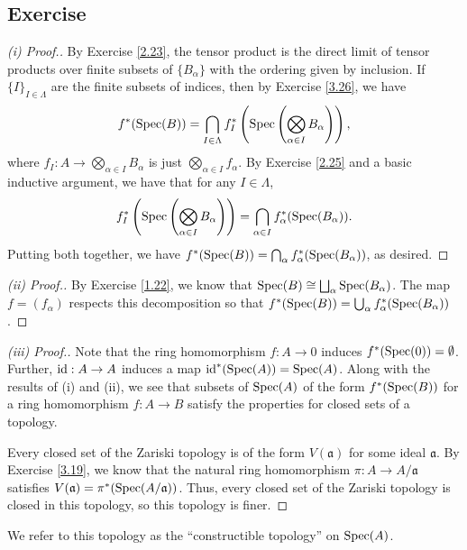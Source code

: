 \subsection{Exercise}\label{3.27}

\begin{proof}[(i) Proof.]
By Exercise \ref{2.23}, the tensor product is the direct limit of tensor products over finite subsets of $\{B_{\alpha}\}$
with the ordering given by inclusion. If $\{I\}_{I \in \Lambda}$ are the finite subsets of indices, then by Exercise \ref{3.26},
we have
$$f^*(\operatorname{Spec}(B)) = \bigcap_{I \in \Lambda}f_I^*\left(\operatorname{Spec}\left(\bigotimes_{\alpha \in I}B_{\alpha}\right)\right),$$
where $f_I : A \to \bigotimes_{\alpha \in I}B_{\alpha}$ is just $\bigotimes_{\alpha \in I}f_{\alpha}$.
By Exercise \ref{2.25} and a basic inductive argument, we have that for any $I \in \Lambda$,
$$f_I^*\left(\operatorname{Spec}\left(\bigotimes_{\alpha \in I}B_{\alpha}\right)\right) = \bigcap_{\alpha \in I}f_{\alpha}^*(\operatorname{Spec}(B_{\alpha})).$$
Putting both together, we have $f^*(\operatorname{Spec}(B)) = \bigcap_{\alpha}f_{\alpha}^*(\operatorname{Spec}(B_{\alpha}))$, as desired.
\end{proof}

\begin{proof}[(ii) Proof.]
By Exercise \ref{1.22}, we know that $\operatorname{Spec}(B) \cong \bigsqcup_{\alpha} \operatorname{Spec}(B_{\alpha})$. The map $f = (f_{\alpha})$ respects this
decomposition so that $f^*(\operatorname{Spec}(B)) = \bigcup_{\alpha} f_{\alpha}^*(\operatorname{Spec}(B_{\alpha}))$.
\end{proof}

\begin{proof}[(iii) Proof.]
Note that the ring homomorphism $f : A \to 0$ induces $f^*(\operatorname{Spec}(0)) = \emptyset$. Further, $\operatorname{id} : A \to A$ induces
a map $\operatorname{id}^*(\operatorname{Spec}(A)) = \operatorname{Spec}(A)$. Along with the results of (i) and (ii), we see that subsets of $\operatorname{Spec}(A)$ of the form
$f^*(\operatorname{Spec}(B))$ for a ring homomorphism $f : A \to B$ satisfy the properties for closed sets of a topology.

Every closed set of the Zariski topology is of the form $V(\mathfrak{a})$ for some ideal $\mathfrak{a}$. By Exercise \ref{3.19},
we know that the natural ring homomorphism $\pi : A \to A/\mathfrak{a}$ satisfies $V(\mathfrak{a}) = \pi^*(\operatorname{Spec}(A/\mathfrak{a}))$.
Thus, every closed set of the Zariski topology is closed in this topology, so this topology is finer.
\end{proof}

\begin{remark}
We refer to this topology as the ``constructible topology'' on $\operatorname{Spec}(A)$.
\end{remark}

